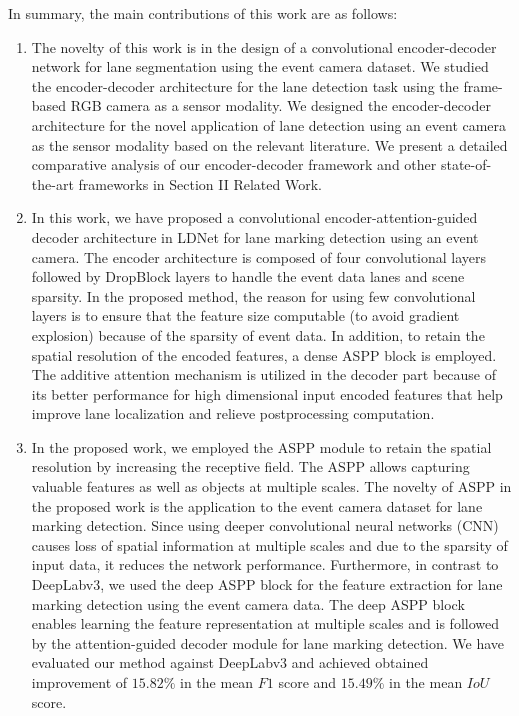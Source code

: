 \documentclass[journal]{IEEEtran}
\begin{document}
\par
In summary, the main contributions of this work are as follows:
\begin{enumerate}

             \item   The novelty of this work is in the design of a convolutional encoder-decoder network for lane segmentation using the event camera dataset. We studied the encoder-decoder architecture for the lane detection task using the frame-based RGB camera as a sensor modality. We designed the encoder-decoder architecture for the novel application of lane detection using an event camera as the sensor modality based on the relevant literature. We present a detailed comparative analysis of our encoder-decoder framework and other state-of-the-art frameworks in Section II Related Work.
             \item  In this work, we have proposed a convolutional encoder-attention-guided decoder architecture in LDNet for lane marking detection using an event camera. The encoder architecture is composed of four convolutional layers followed by DropBlock layers to handle the event data lanes and scene sparsity. In the proposed method, the reason for using few convolutional layers is to ensure that the feature size computable (to avoid gradient explosion) because of the sparsity of event data. In addition, to retain the spatial resolution of the encoded features, a dense ASPP block is employed. The additive attention mechanism is utilized in the decoder part because of its better performance for high dimensional input encoded features that help improve lane localization and relieve postprocessing computation.
             \item In the proposed work, we employed the ASPP module to retain the spatial resolution by increasing the receptive field. The ASPP allows capturing valuable features as well as objects at multiple scales. The novelty of ASPP in the proposed work is the application to the event camera dataset for lane marking detection. Since using deeper convolutional neural networks (CNN) causes loss of spatial information at multiple scales and due to the sparsity of input data, it reduces the network performance. Furthermore, in contrast to DeepLabv3, we used the deep ASPP block for the feature extraction for lane marking detection using the event camera data. The deep ASPP block enables learning the feature representation at multiple scales and is followed by the attention-guided decoder module for lane marking detection. We have evaluated our method against DeepLabv3 and achieved obtained improvement of $15.82\%$ in the mean $F1$ score and $15.49\%$ in the mean $IoU$ score. 
\end{enumerate}
\end{document}
